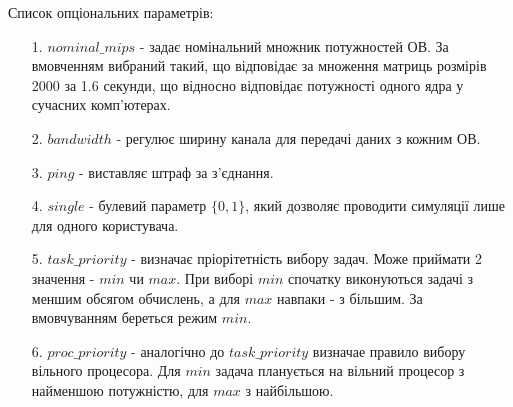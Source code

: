 Список опціональних параметрів:
\begin{itemize}
	\item[1.] $nominal\_mips$ - задає номінальний множник потужностей ОВ. За вмовченням вибраний такий, що відповідає за множення матриць розмірів 2000 за 1.6 секунди, що відносно відповідає потужності одного ядра у сучасних комп'ютерах.
	\item[2.] $bandwidth$ - регулює ширину канала для передачі даних з кожним ОВ.
	\item[3.] $ping$ - виставляє штраф за з'єднання.
	\item[4.] $single$ - булевий параметр $\{0,1\}$, який дозволяє проводити симуляції лише для одного користувача.
	\item[5.] $task\_priority$ - визначає пріорітетність вибору задач. Може приймати 2 значення - $min$ чи $max$. При виборі $min$ спочатку виконуються задачі з меншим обсягом обчислень, а для $max$ навпаки - з більшим. За вмовчуванням береться режим $min$.
	\item[6.] $proc\_priority$ - аналогічно до $task\_priority$ визначае правило вибору вільного процесора. Для $min$ задача планується на вільний процесор з найменшою потужністю, для $max$ з найбільшою.
\end{itemize}

